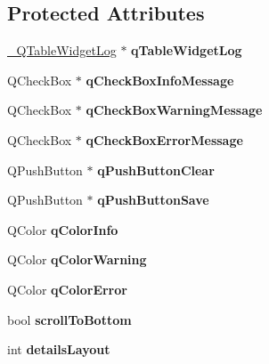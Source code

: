 \subsection*{Protected Attributes}
\begin{DoxyCompactItemize}
\item 
\hypertarget{classQELog_af777a0bf10d169f067db5f8cc30ab36b}{
\hyperlink{class__QTableWidgetLog}{\_\-QTableWidgetLog} $\ast$ {\bfseries qTableWidgetLog}}
\label{classQELog_af777a0bf10d169f067db5f8cc30ab36b}

\item 
\hypertarget{classQELog_aae55b98c54f90af7407266a5b51980b1}{
QCheckBox $\ast$ {\bfseries qCheckBoxInfoMessage}}
\label{classQELog_aae55b98c54f90af7407266a5b51980b1}

\item 
\hypertarget{classQELog_a4912b66605b4070917002561bbe8542a}{
QCheckBox $\ast$ {\bfseries qCheckBoxWarningMessage}}
\label{classQELog_a4912b66605b4070917002561bbe8542a}

\item 
\hypertarget{classQELog_af794a6ac311b31900f9040f6cd9801e9}{
QCheckBox $\ast$ {\bfseries qCheckBoxErrorMessage}}
\label{classQELog_af794a6ac311b31900f9040f6cd9801e9}

\item 
\hypertarget{classQELog_a364e8307f60739053bfdf07e4ddce99d}{
QPushButton $\ast$ {\bfseries qPushButtonClear}}
\label{classQELog_a364e8307f60739053bfdf07e4ddce99d}

\item 
\hypertarget{classQELog_ad2b0526aabf80a9715006a387672438f}{
QPushButton $\ast$ {\bfseries qPushButtonSave}}
\label{classQELog_ad2b0526aabf80a9715006a387672438f}

\item 
\hypertarget{classQELog_a5e48b41a339d171df6ef7ebc27236d56}{
QColor {\bfseries qColorInfo}}
\label{classQELog_a5e48b41a339d171df6ef7ebc27236d56}

\item 
\hypertarget{classQELog_a04869b854c9b40cf69b65d0d8d1a621c}{
QColor {\bfseries qColorWarning}}
\label{classQELog_a04869b854c9b40cf69b65d0d8d1a621c}

\item 
\hypertarget{classQELog_a8a81427931a667eb7660164c055b829f}{
QColor {\bfseries qColorError}}
\label{classQELog_a8a81427931a667eb7660164c055b829f}

\item 
\hypertarget{classQELog_a3f5670503907fe9a6412d5cbf341419d}{
bool {\bfseries scrollToBottom}}
\label{classQELog_a3f5670503907fe9a6412d5cbf341419d}

\item 
\hypertarget{classQELog_a2e919dc42b8651e940433c6f0f91759f}{
int {\bfseries detailsLayout}}
\label{classQELog_a2e919dc42b8651e940433c6f0f91759f}

\end{DoxyCompactItemize}
